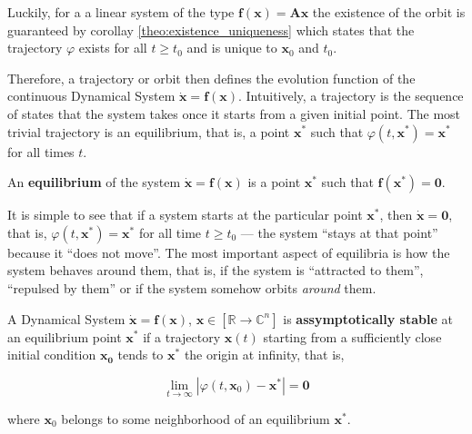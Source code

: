 	Luckily, for a a linear system of the type $\mathbf{f}\left(\mathbf{x}\right) = \mathbf{Ax}$ the existence of the orbit is guaranteed by corollay \ref{theo:existence_uniqueness} which states that the trajectory $\varphi$ exists for all $t\geq t_0$ and is unique to $\mathbf{x}_0$ and $t_0$.

	Therefore, a trajectory or orbit then defines the evolution function of the continuous Dynamical System $\dot{\mathbf{x}} = \mathbf{f(x)}$. Intuitively, a trajectory is the sequence of states that the system takes once it starts from a given initial point. The most trivial trajectory is an equilibrium, that is, a point $\mathbf{x}^*$ such that $\varphi\left(t,\mathbf{x}^*\right) = \mathbf{x}^*$ for all times $t$. 

\begin{definition}[Equilibrium] An \textbf{equilibrium} of the system $\dot{\mathbf{x}} = \mathbf{f(x)}$ is a point $\mathbf{x}^*$ such that $\mathbf{f}\left(\mathbf{x}^*\right) = \mathbf{0}$. \end{definition}

	It is simple to see that if a system starts at the particular point $\mathbf{x}^*$, then $\dot{\mathbf{x}} = \mathbf{0}$, that is, $\varphi\left(t,\mathbf{x}^*\right) = \mathbf{x}^*$ for all time $t\geq t_0$ — the system ``stays at that point'' because it ``does not move''. The most important aspect of equilibria is how the system behaves around them, that is, if the system is ``attracted to them'', ``repulsed by them'' or if the system somehow orbits \textit{around} them. 

\begin{definition} A Dynamical System $\dot{\mathbf{x}} = \mathbf{f}\left(\mathbf{x}\right)$, $\mathbf{x}\in\left[\mathbb{R}\to\mathbb{C}^n\right]$ is \textbf{assymptotically stable} at an equilibrium point $\mathbf{x}^*$ if a trajectory $\mathbf{x}(t)$ starting from a sufficiently close initial condition $\mathbf{x_0}$ tends to $\mathbf{x}^*$ the origin at infinity, that is,

\begin{equation} \lim_{t\to\infty} \left\lvert \varphi\left(t,\mathbf{x}_0\right) - \mathbf{x}^*\right\rvert = \mathbf{0} \end{equation}

	\noindent where $\mathbf{x}_0$ belongs to some neighborhood of an equilibrium $\mathbf{x}^*$.
\end{definition}

